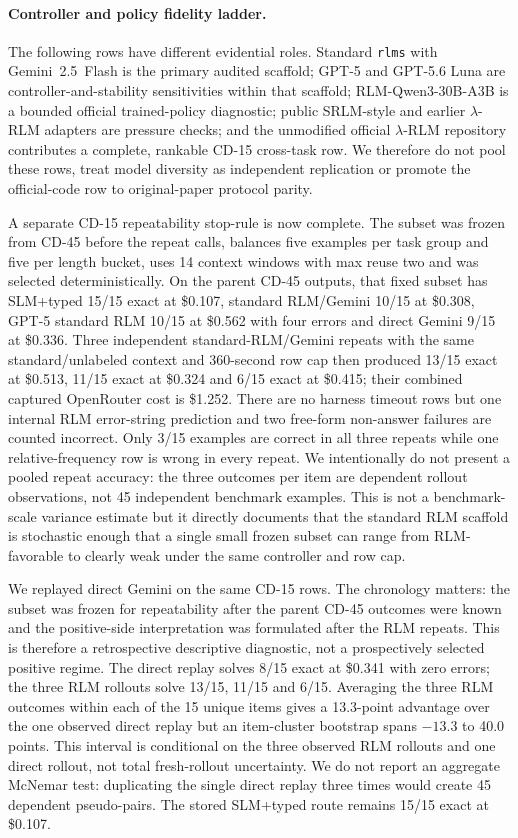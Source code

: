 \documentclass[letterpaper]{article}
\begin{document}
\paragraph{Controller and policy fidelity ladder.}
The following rows have different evidential roles. Standard \texttt{rlms} with Gemini~2.5~Flash is the primary audited scaffold; GPT-5 and GPT-5.6 Luna are controller-and-stability sensitivities within that scaffold; RLM-Qwen3-30B-A3B is a bounded official trained-policy diagnostic; public SRLM-style and earlier $\lambda$-RLM adapters are pressure checks; and the unmodified official $\lambda$-RLM repository contributes a complete, rankable CD-15 cross-task row. We therefore do not pool these rows, treat model diversity as independent replication or promote the official-code row to original-paper protocol parity.

A separate CD-15 repeatability stop-rule is now complete. The subset was frozen from CD-45 before the repeat calls, balances five examples per task group and five per length bucket, uses 14 context windows with max reuse two and was selected deterministically. On the parent CD-45 outputs, that fixed subset has SLM+typed 15/15 exact at \$0.107, standard RLM/Gemini 10/15 at \$0.308, GPT-5 standard RLM 10/15 at \$0.562 with four errors and direct Gemini 9/15 at \$0.336. Three independent standard-RLM/Gemini repeats with the same standard/unlabeled context and 360-second row cap then produced 13/15 exact at \$0.513, 11/15 exact at \$0.324 and 6/15 exact at \$0.415; their combined captured OpenRouter cost is \$1.252. There are no harness timeout rows but one internal RLM error-string prediction and two free-form non-answer failures are counted incorrect. Only 3/15 examples are correct in all three repeats while one relative-frequency row is wrong in every repeat. We intentionally do not present a pooled repeat accuracy: the three outcomes per item are dependent rollout observations, not 45 independent benchmark examples. This is not a benchmark-scale variance estimate but it directly documents that the standard RLM scaffold is stochastic enough that a single small frozen subset can range from RLM-favorable to clearly weak under the same controller and row cap.

We replayed direct Gemini on the same CD-15 rows. The chronology matters: the subset was frozen for repeatability after the parent CD-45 outcomes were known and the positive-side interpretation was formulated after the RLM repeats. This is therefore a retrospective descriptive diagnostic, not a prospectively selected positive regime. The direct replay solves 8/15 exact at \$0.341 with zero errors; the three RLM rollouts solve 13/15, 11/15 and 6/15. Averaging the three RLM outcomes within each of the 15 unique items gives a 13.3-point advantage over the one observed direct replay but an item-cluster bootstrap spans $-13.3$ to 40.0 points. This interval is conditional on the three observed RLM rollouts and one direct rollout, not total fresh-rollout uncertainty. We do not report an aggregate McNemar test: duplicating the single direct replay three times would create 45 dependent pseudo-pairs. The stored SLM+typed route remains 15/15 exact at \$0.107.
\end{document}
